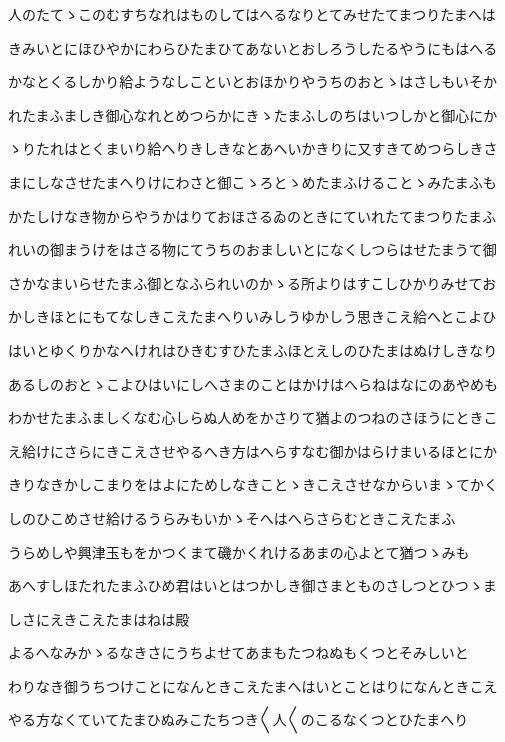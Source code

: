 \documentclass[a4paper,11pt,landscape]{ltjtarticle}
\begin{document}
\par\medskip
人のたてゝこのむすちなれはものしてはへるなりとてみせたてまつりたまへは
\par\medskip
きみいとにほひやかにわらひたまひてあないとおしろうしたるやうにもはへる
\par\medskip
かなとくるしかり給ようなしこといとおほかりやうちのおとゝはさしもいそか
\par\medskip
れたまふましき御心なれとめつらかにきゝたまふしのちはいつしかと御心にか
\par\medskip
ゝりたれはとくまいり給へりきしきなとあへいかきりに又すきてめつらしきさ
\par\medskip
まにしなさせたまへりけにわさと御こゝろとゝめたまふけることゝみたまふも
\par\medskip
かたしけなき物からやうかはりておほさるゐのときにていれたてまつりたまふ
\par\medskip
れいの御まうけをはさる物にてうちのおましいとになくしつらはせたまうて御
\par\medskip
さかなまいらせたまふ御となふられいのかゝる所よりはすこしひかりみせてお
\par\medskip
かしきほとにもてなしきこえたまへりいみしうゆかしう思きこえ給へとこよひ
\par\medskip
はいとゆくりかなへけれはひきむすひたまふほとえしのひたまはぬけしきなり
\par\medskip
あるしのおとゝこよひはいにしへさまのことはかけはへらねはなにのあやめも
\par\medskip
わかせたまふましくなむ心しらぬ人めをかさりて猶よのつねのさほうにときこ
\par\medskip
え給けにさらにきこえさせやるへき方はへらすなむ御かはらけまいるほとにか
\par\medskip
きりなきかしこまりをはよにためしなきことゝきこえさせなからいまゝてかく
\par\medskip
しのひこめさせ給けるうらみもいかゝそへはへらさらむときこえたまふ
\par\medskip
うらめしや興津玉もをかつくまて磯かくれけるあまの心よとて猶つゝみも
\par\medskip
あへすしほたれたまふひめ君はいとはつかしき御さまとものさしつとひつゝま
\par\medskip
しさにえきこえたまはねは殿
\par\medskip
よるへなみかゝるなきさにうちよせてあまもたつねぬもくつとそみしいと
\par\medskip
わりなき御うちつけことになんときこえたまへはいとことはりになんときこえ
\par\medskip
やる方なくていてたまひぬみこたちつき〱人〱のこるなくつとひたまへり
\end{document}
